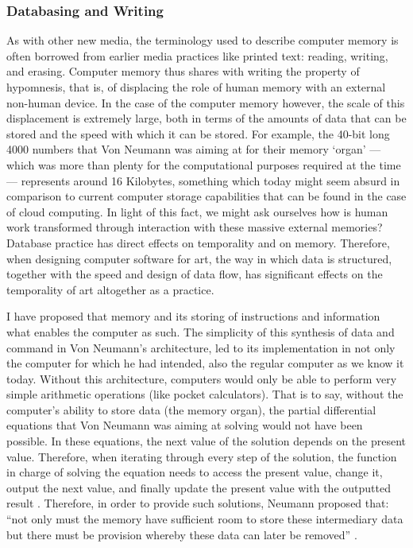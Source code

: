\subsubsection{Databasing and Writing}

As with other new media, the terminology used to describe computer memory is often borrowed from earlier media practices like printed text: reading, writing, and erasing. Computer memory thus shares with writing the property of hypomnesis, that is, of displacing the role of human memory with an external non-human device. In the case of the computer memory however, the scale of this displacement is extremely large, both in terms of the amounts of data that can be stored and the speed with which it can be stored. For example, the 40-bit long 4000 numbers that Von Neumann was aiming at for their memory `organ' ---which was more than plenty for the computational purposes required at the time--- represents around 16 Kilobytes, something which today might seem absurd in comparison to current computer storage capabilities that can be found in the case of cloud computing. In light of this fact, we might ask ourselves how is human work transformed through interaction with these massive external memories? Database practice has direct effects on temporality and on memory. Therefore, when designing computer software for art, the way in which data is structured, together with the speed and design of data flow, has significant effects on the temporality of art altogether as a practice. 

I have proposed that memory and its storing of instructions and information what enables the computer as such. The simplicity of this synthesis of data and command in Von Neumann's architecture, led to its implementation in not only the computer for which he had intended, also the regular computer as we know it today. Without this architecture, computers would only be able to perform very simple arithmetic operations (like pocket calculators). That is to say, without the computer's ability to store data (the memory organ), the partial differential equations that Von Neumann was aiming at solving would not have been possible. In these equations, the next value of the solution depends on the present value. Therefore, when iterating through every step of the solution, the function in charge of solving the equation needs to access the present value, change it, output the next value, and finally update the present value with the outputted result . Therefore, in order to provide such solutions, Neumann proposed that: ``not only must the memory have sufficient room to store these intermediary data but there must be provision whereby these data can later be removed'' \parencite[3]{von46:Pre}.

